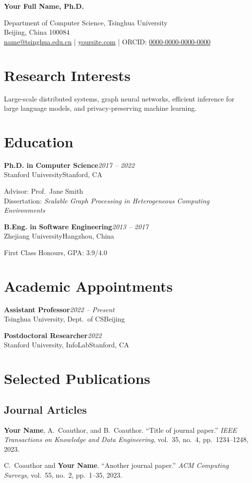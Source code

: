 \documentclass[11pt,a4paper]{article}
\newcommand{\cventry}[4]{%
  \textbf{#1}\hfill\textit{#2}\\
  #3\hfill#4\par\smallskip
}
\begin{document}
\begin{center}
{\LARGE\bfseries Your Full Name, Ph.D.}\par\smallskip
{\small
Department of Computer Science, Tsinghua University\\
Beijing, China 100084\\
\href{mailto:name@tsinghua.edu.cn}{name@tsinghua.edu.cn}
\quad|\quad
\href{https://yoursite.com}{yoursite.com}
\quad|\quad
ORCID: \href{https://orcid.org/0000-0000-0000-0000}{0000-0000-0000-0000}
}\par
\end{center}

\section{Research Interests}
Large-scale distributed systems, graph neural networks, efficient inference for large language models, and privacy-preserving machine learning.

\section{Education}
\cventry{Ph.D. in Computer Science}{2017 -- 2022}{Stanford University}{Stanford, CA}
Advisor: Prof.\ Jane Smith\\
Dissertation: \textit{Scalable Graph Processing in Heterogeneous Computing Environments}

\smallskip
\cventry{B.Eng. in Software Engineering}{2013 -- 2017}{Zhejiang University}{Hangzhou, China}
First Class Honours, GPA: 3.9/4.0

\section{Academic Appointments}
\cventry{Assistant Professor}{2022 -- Present}{Tsinghua University, Dept.\ of CS}{Beijing}
\cventry{Postdoctoral Researcher}{2022}{Stanford University, InfoLab}{Stanford, CA}

\section{Selected Publications}

\subsection{Journal Articles}
\begin{enumerate}[label={[J\arabic*]}]
\item \textbf{Your Name}, A.\ Coauthor, and B.\ Coauthor. ``Title of journal paper.'' \textit{IEEE Transactions on Knowledge and Data Engineering}, vol.\ 35, no.\ 4, pp.\ 1234--1248, 2023.
\item C.\ Coauthor and \textbf{Your Name}. ``Another journal paper.'' \textit{ACM Computing Surveys}, vol.\ 55, no.\ 2, pp.\ 1--35, 2023.
\end{enumerate}
\end{document}
